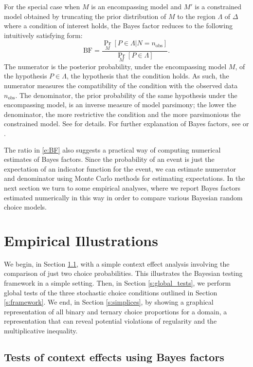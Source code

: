 \documentclass[11pt,letter]{article}
\begin{document}
For the special case when $M$ is an encompassing model and $M'$ is a constrained model obtained by truncating the prior distribution of $M$ to the region $\Lambda$ of $\Delta$ where a condition of interest holds, the Bayes factor reduces to the following intuitively satisfying form:
\begin{equation}\label{e:BF}
  \mathrm{BF} = \frac{\Pr_M[P \in \Lambda|N = n_\mathrm{obs}]}{\Pr_M[P \in \Lambda]}.
\end{equation}
The numerator is the posterior probability, under the encompassing model $M$, of the hypothesis $P \in \Lambda$, the hypothesis that the condition holds.
As such, the numerator measures the compatibility of the condition with the observed data $n_\mathrm{obs}$.
The denominator, the prior probability of the same hypothesis under the encompassing model, is an inverse measure of model parsimony; the lower the denominator, the more restrictive the condition and the more parsimonious the constrained model.
See \citet{KlugHoij07} for details.
For further explanation of Bayes factors, see \citet{Berg85} or \citet{BernSmit94}.

The ratio in \eqref{e:BF} also suggests a practical way of computing numerical estimates of Bayes factors.
Since the probability of an event is just the expectation of an indicator function for the event, we can estimate numerator and denominator using Monte Carlo methods for estimating expectations.
In the next section we turn to some empirical analyses, where we report Bayes factors estimated numerically in this way in order to compare various Bayesian random choice models.

\section{Empirical Illustrations}\label{s:results}

We begin, in Section \ref{s:context_test}, with a simple context effect analysis involving the comparison of just two choice probabilities.
This illustrates the Bayesian testing framework in a simple setting.
Then, in Section \ref{s:global_tests}, we perform global tests of the three stochastic choice conditions outlined in Section \ref{s:framework}.
We end, in Section \ref{s:simplices}, by showing a graphical representation of all binary and ternary choice proportions for a domain, a representation that can reveal potential violations of regularity and the multiplicative inequality.

\subsection{Tests of context effects using Bayes factors}\label{s:context_test}
\end{document}
